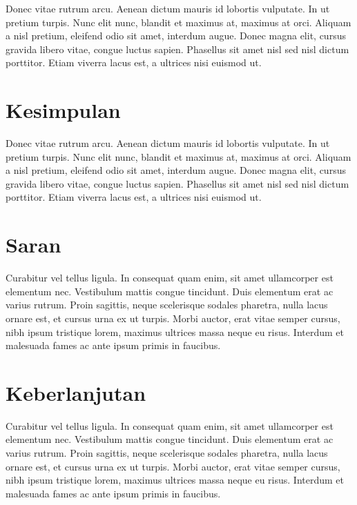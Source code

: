 

Donec vitae rutrum arcu. Aenean dictum mauris id lobortis
vulputate. In ut pretium turpis. Nunc elit nunc, blandit et maximus
at, maximus at orci. Aliquam a nisl pretium, eleifend odio sit amet,
interdum augue. Donec magna elit, cursus gravida libero vitae, congue
luctus sapien. Phasellus sit amet nisl sed nisl dictum
porttitor. Etiam viverra lacus est, a ultrices nisi euismod ut.


\section{Kesimpulan}

Donec vitae rutrum arcu. Aenean dictum mauris id lobortis
vulputate. In ut pretium turpis. Nunc elit nunc, blandit et maximus
at, maximus at orci. Aliquam a nisl pretium, eleifend odio sit amet,
interdum augue. Donec magna elit, cursus gravida libero vitae, congue
luctus sapien. Phasellus sit amet nisl sed nisl dictum
porttitor. Etiam viverra lacus est, a ultrices nisi euismod ut.


\section{Saran}

Curabitur vel tellus ligula. In consequat quam enim, sit amet
ullamcorper est elementum nec. Vestibulum mattis congue
tincidunt. Duis elementum erat ac varius rutrum. Proin sagittis, neque
scelerisque sodales pharetra, nulla lacus ornare est, et cursus urna
ex ut turpis. Morbi auctor, erat vitae semper cursus, nibh ipsum
tristique lorem, maximus ultrices massa neque eu risus. Interdum et
malesuada fames ac ante ipsum primis in faucibus.

\section{Keberlanjutan}

Curabitur vel tellus ligula. In consequat quam enim, sit amet
ullamcorper est elementum nec. Vestibulum mattis congue
tincidunt. Duis elementum erat ac varius rutrum. Proin sagittis, neque
scelerisque sodales pharetra, nulla lacus ornare est, et cursus urna
ex ut turpis. Morbi auctor, erat vitae semper cursus, nibh ipsum
tristique lorem, maximus ultrices massa neque eu risus. Interdum et
malesuada fames ac ante ipsum primis in faucibus.
